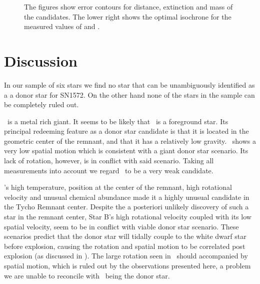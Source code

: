 \begin{figure}[htbp]
   \caption{The figures show error contours for distance, extinction and mass of the candidates. The lower right shows the optimal isochrone \citep{2004ApJ...612..168P}  for the measured values of  and . }
   \label{fig:mc_isochrone}
\end{figure}



\section{Discussion}
\label{sec:discussion}

In our sample of six stars we find no star that can be unambiguously identified as a a donor star for SN1572. On the other hand none of the stars in the sample can be completely ruled out. 

\stara\ is a metal rich giant. It seems to be likely that \stara\ is a foreground star. Its principal redeeming feature as a donor star candidate is that it is located in the geometric center of the remnant, and that it has a relatively low gravity. \stara\ shows a very low spatial motion which is consistent with a giant donor star scenario. Its lack of rotation, however, is in conflict with said scenario. 
Taking all measurements into account we regard \stara\ to be a very weak candidate.

\starb's  high temperature, position at the center of the remnant, high rotational velocity and unusual chemical abundance made it a highly unusual candidate in the Tycho Remnant center. Despite the a posteriori unlikely discovery of such a star in the remnant center, Star B's high rotational velocity coupled with its low spatial velocity, seem to be in conflict with viable donor star scenario. 
These scenarios predict that the donor star will tidally couple to the white dwarf star before explosion, causing the rotation and spatial motion to be correlated post explosion (as discussed in \wek). The large rotation seen in \starb\ should accompanied by spatial motion, which is ruled out by the observations presented here, a problem we are unable to reconcile with \starb\ being the donor star. 

